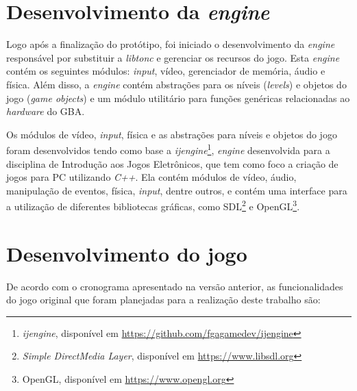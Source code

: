 \section{Desenvolvimento da \textit{engine}}

  Logo após a finalização do protótipo, foi iniciado o desenvolvimento da \textit{engine} responsável por substituir a \textit{libtonc} e gerenciar os recursos do jogo. Esta \textit{engine} contém os seguintes módulos: \textit{input}, vídeo, gerenciador de memória, áudio e física. Além disso, a \textit{engine} contém abstrações para os níveis (\textit{levels}) e objetos do jogo (\textit{game objects}) e um módulo utilitário para funções genéricas relacionadas ao \textit{hardware} do GBA.

  Os módulos de vídeo, \textit{input}, física e as abstrações para níveis e objetos do jogo foram desenvolvidos tendo como base a \textit{ijengine}\footnote{\textit{ijengine}, disponível em \url{https://github.com/fgagamedev/ijengine}}, \textit{engine} desenvolvida para a disciplina de Introdução aos Jogos Eletrônicos, que tem como foco a criação de jogos para PC utilizando \textit{C++}. Ela contém módulos de vídeo, áudio, manipulação de eventos, física, \textit{input}, dentre outros, e contém uma interface para a utilização de diferentes bibliotecas gráficas, como SDL\footnote{\textit{Simple DirectMedia Layer}, disponível em \url{https://www.libsdl.org}} e OpenGL\footnote{OpenGL, disponível em \url{https://www.opengl.org}}.

  

  

  

  

  

  

\section{Desenvolvimento do jogo}

  De acordo com o cronograma apresentado na versão anterior, as funcionalidades do jogo original que foram planejadas para a realização deste trabalho são:

